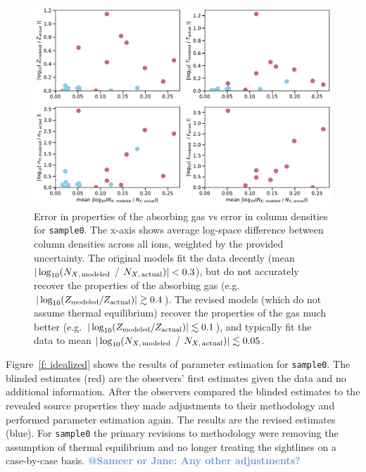 \documentclass[fleqn,usenatbib]{mnras}
\makeatletter
\newcommand{\atsameer}[1]{\textcolor{CornflowerBlue}{\textbf{@Sameer or Jane: #1}}}
\makeatother
\begin{document}
\begin{figure}
    \centering
    \includegraphics[width=\textwidth]{figures/sample0/error_vs_error.pdf}
    \caption{
    Error in properties of the absorbing gas vs error in column densities for \texttt{sample0}.
    The x-axis shows average log-space difference between column densities across all ions, weighted by the provided uncertainty.
    The original models fit the data decently (mean $\vert \log_{10}( N_{X,\,{\rm modeled}}$ / $N_{X,\,{\rm actual}}) \vert < 0.3$), but do not accurately recover the properties of the absorbing gas (e.g. $\vert \log_{10}( Z_{\rm modeled} / Z_{\rm actual}) \vert \gtrsim 0.4$).
    The revised models (which do not assume thermal equilibrium) recover the properties of the gas much better (e.g. $\vert \log_{10}( Z_{\rm modeled} / Z_{\rm actual}) \vert \lesssim 0.1$), and typically fit the data to mean $\vert \log_{10}( N_{X,\,{\rm modeled}}$ / $N_{X,\,{\rm actual}}) \vert \lesssim 0.05$.
    }
    \label{f: error vs error}
\end{figure}

Figure~\ref{f: idealized} shows the results of parameter estimation for \texttt{sample0}.
The blinded estimates (red)  are the observers' first estimates given the data and no additional information.
After the observers compared the blinded estimates to the revealed source properties they made adjustments to their methodology and performed parameter estimation again.
The results are the revised estimates (blue).
For \texttt{sample0} the primary revisions to methodology were removing the assumption of thermal equilibrium and no longer treating the sightlines on a case-by-case basis.
\atsameer{Any other adjustments?}
\end{document}

